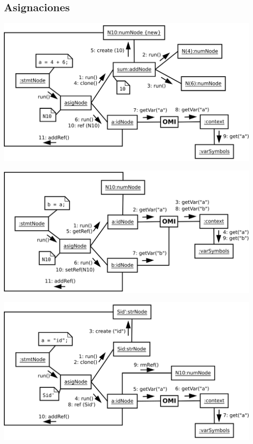 \subsection {Asignaciones }
\begin{center}
\includegraphics[scale=0.38]{asig.png} \\
\end{center}

\begin{center}
\includegraphics[scale=0.38]{asig2.png} \\
\end{center}

\begin{center}
\includegraphics[scale=0.38]{asig3.png} \\
\end{center}


